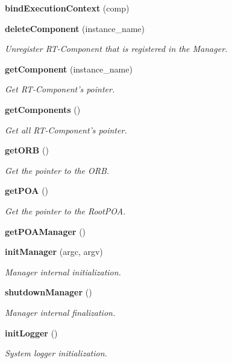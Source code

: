 \begin{CompactItemize}
{\bf bind\-Execution\-Context} (comp)
\item 
{\bf delete\-Component} (instance\_\-name)
\begin{CompactList}\small\item\em Unregister RT-Component that is registered in the Manager. \item\end{CompactList}\item 
{\bf get\-Component} (instance\_\-name)
\begin{CompactList}\small\item\em Get RT-Component's pointer. \item\end{CompactList}\item 
{\bf get\-Components} ()
\begin{CompactList}\small\item\em Get all RT-Component's pointer. \item\end{CompactList}\item 
{\bf get\-ORB} ()
\begin{CompactList}\small\item\em Get the pointer to the ORB. \item\end{CompactList}\item 
{\bf get\-POA} ()
\begin{CompactList}\small\item\em Get the pointer to the Root\-POA. \item\end{CompactList}\item 
{\bf get\-POAManager} ()
\item 
{\bf init\-Manager} (argc, argv)
\begin{CompactList}\small\item\em Manager internal initialization. \item\end{CompactList}\item 
{\bf shutdown\-Manager} ()
\begin{CompactList}\small\item\em Manager internal finalization. \item\end{CompactList}\item 
{\bf init\-Logger} ()
\begin{CompactList}\small\item\em System logger initialization. \item\end{CompactList}\item 

\end{CompactItemize}
